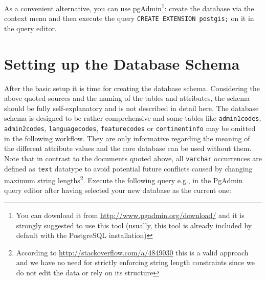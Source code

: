 \documentclass[fontsize=12pt, BCOR=10mm, DIV=14, parskip=true,headings=small]{scrartcl}
\begin{document}
As a convenient alternative, you can use pgAdmin\footnote{You can download it from \url{http://www.pgadmin.org/download/} and it is strongly suggested to use this tool (usually, this tool is already included by default with the PostgreSQL installation)}: create the database via the context menu and then execute the query \texttt{CREATE EXTENSION postgis;} on it in the query editor.

\section{Setting up the Database Schema}
After the basic setup it is time for creating the database schema. Considering the above quoted sources and the naming of the tables and attributes, the schema should be fully self-explanatory and is not described in detail here. The database schema is designed to be rather comprehensive and some tables like \texttt{admin1codes}, \texttt{admin2codes}, \texttt{languagecodes}, \texttt{featurecodes} or \texttt{continentinfo} may be omitted in the following workflow. They are only informative regarding the meaning of the different attribute values and the core database can be used without them. Note that in contrast to the documents quoted above, all \texttt{varchar} occurrences are defined as \texttt{text} datatype to avoid potential future conflicts caused by changing maximum string lengths\footnote{According to \url{http://stackoverflow.com/a/4849030} this is a valid approach and we have no need for strictly enforcing string length constraints since we do not edit the data or rely on its structure}. Execute the following query e.g., in the PgAdmin query editor after having selected your new database as the current one:
\end{document}
